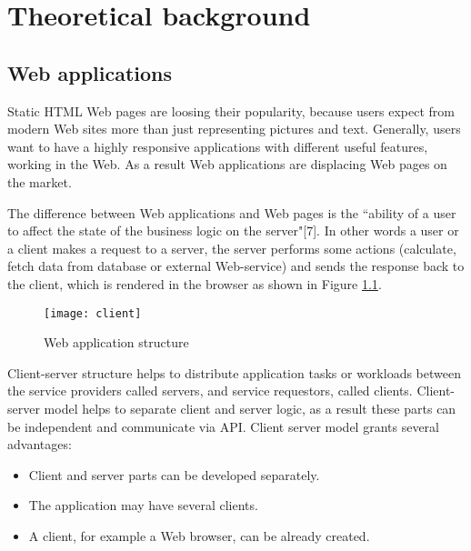 \chapter{Theoretical background}
\label{ch:background} 
	\section{Web applications}
		
	  Static HTML Web pages are loosing their popularity, because users
	  expect from modern Web sites more than just representing pictures and text.
	  Generally, users want to have a highly responsive applications with
	  different useful features, working in the Web. As a result Web applications are displacing Web
	  pages on the market.
	  
	   The difference between Web applications and Web pages is the
	 ``ability of a user to affect the state of the business logic on the
	 server"[7]. In other words a user or a client makes a request to a server,
	 the server performs some actions (calculate, fetch data from database or
	 external Web-service) and sends the response back to the client, which is
	 rendered in the browser as shown in Figure \ref{fig:pic1}.
	  
	  \begin{figure}
      	\texttt{[image: client]}
      	\caption{Web application structure}
      	\label{fig:pic1}
      \end{figure}
	  
    	Client-server structure helps to distribute application tasks or workloads
    	between the service providers called servers, and service requestors,
    	called clients. Client-server model helps to separate client and server logic, as
    	a result these parts can be independent and communicate via API. Client
    	server model grants several advantages:
    	\begin{itemize}
    	  \item Client and server parts can be developed separately.
    	  \item The application may have several clients.
    	  \item A client, for example a Web browser, can be already created.
    	\end{itemize}
    		
